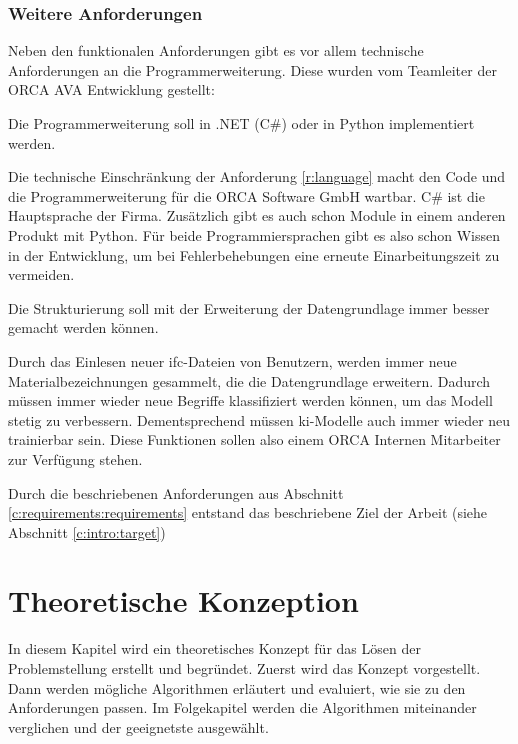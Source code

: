\subsection{Weitere Anforderungen}
\label{c:requirements:requirements:additional}

Neben den funktionalen Anforderungen gibt es vor allem technische Anforderungen an die Programmerweiterung. Diese wurden vom Teamleiter der ORCA AVA Entwicklung gestellt:

\begin{requirement}
	\label{r:language}
	Die Programmerweiterung soll in .NET (C\#) oder in Python implementiert werden.
\end{requirement}

Die technische Einschränkung der Anforderung \ref{r:language} macht den Code und die Programmerweiterung für die ORCA Software GmbH wartbar. C\# ist die Hauptsprache der Firma. Zusätzlich gibt es auch schon Module in einem anderen Produkt mit Python. Für beide Programmiersprachen gibt es also schon Wissen in der Entwicklung, um bei Fehlerbehebungen eine erneute Einarbeitungszeit zu vermeiden.

\begin{requirement}
	\label{r:improvement}
	Die Strukturierung soll mit der Erweiterung der Datengrundlage immer besser gemacht werden können.
\end{requirement}

Durch das Einlesen neuer \ac{ifc}-Dateien von Benutzern, werden immer neue Materialbezeichnungen gesammelt, die die Datengrundlage erweitern. Dadurch müssen immer wieder neue Begriffe klassifiziert werden können, um das Modell stetig zu verbessern. Dementsprechend müssen \ac{ki}-Modelle auch immer wieder neu trainierbar sein. Diese Funktionen sollen also einem ORCA Internen Mitarbeiter zur Verfügung stehen.

Durch die beschriebenen Anforderungen aus Abschnitt \ref{c:requirements:requirements} entstand das beschriebene Ziel der Arbeit (siehe Abschnitt \ref{c:intro:target})

\chapter{Theoretische Konzeption}
\label{c:conception}
In diesem Kapitel wird ein theoretisches Konzept für das Lösen der Problemstellung erstellt und begründet. Zuerst wird das Konzept vorgestellt. Dann werden mögliche Algorithmen erläutert und evaluiert, wie sie zu den Anforderungen passen. Im Folgekapitel werden die Algorithmen miteinander verglichen und der geeignetste ausgewählt.

